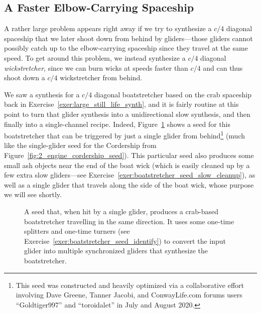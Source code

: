 \subsection{A Faster Elbow-Carrying Spaceship}\label{sec:fast_demonoid_elbow_carry}

A rather large problem appears right away if we try to synthesize a $c/4$ diagonal spaceship that we later shoot down from behind by gliders---those gliders cannot possibly catch up to the elbow-carrying spaceship since they travel at the same speed. To get around this problem, we instead synthesize a $c/4$ diagonal \emph{wickstretcher}, since we can burn wicks at speeds faster than $c/4$ and can thus shoot down a $c/4$ wickstretcher from behind.

We saw a synthesis for a $c/4$ diagonal boatstretcher based on the crab spaceship back in Exercise~\ref{exer:large_still_life_synth}, and it is fairly routine at this point to turn that glider synthesis into a unidirectional slow synthesis, and then finally into a single-channel recipe. Indeed, Figure~\ref{fig:boatstretcher_seed} shows a seed for this boatstretcher that can be triggered by just a single glider from behind\footnote{This seed was constructed and heavily optimized via a collaborative effort involving Dave Greene, Tanner Jacobi, and ConwayLife.com forums users ``Goldtiger997'' and ``toroidalet'' in July and August 2020.} (much like the single-glider seed for the Cordership from Figure~\ref{fig:2_engine_cordership_seed}). This particular seed also produces some small ash objects near the end of the boat wick (which is easily cleaned up by a few extra slow gliders---see Exercise~\ref{exer:boatstretcher_seed_slow_cleanup}), as well as a single glider that travels along the side of the boat wick, whose purpose we will see shortly.

\begin{figure}[!htb]
	\centering
	
	\caption{A seed that, when hit by a single glider, produces a crab-based boatstretcher travelling in the same direction. It uses some one-time splitters and one-time turners (see Exercise~\ref{exer:boatstretcher_seed_identify}) to convert the input glider into multiple synchronized gliders that synthesize the boatstretcher.}\label{fig:boatstretcher_seed}
\end{figure}

